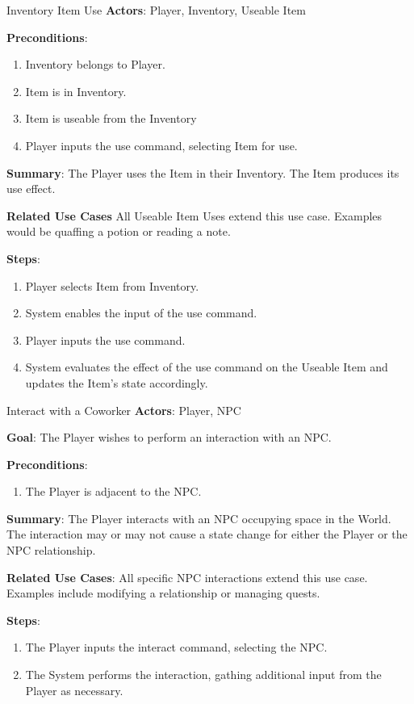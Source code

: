 \documentclass[12pt]{report}
\begin{document}
    \begin{subsection}{Inventory Item Use}
      \textbf{Actors}:
      Player, Inventory, Useable Item

      \textbf{Preconditions}:
      \begin{enumerate}
      	\item Inventory belongs to Player.
      	\item Item is in Inventory.
      	\item Item is useable from the Inventory
      	\item Player inputs the use command, selecting Item for use.
      \end{enumerate}

      \textbf{Summary}:
      The Player uses the Item in their Inventory. The Item produces its
      use effect.

      \textbf{Related Use Cases}
      All Useable Item Uses extend this use case. Examples would be quaffing
      a potion or reading a note.

      \textbf{Steps}:
      \begin{enumerate}
        \item Player selects Item from Inventory.
        \item System enables the input of the use command.
        \item Player inputs the use command.
        \item System evaluates the effect of the use command on the
        Useable Item and updates the Item's state accordingly.
      \end{enumerate}
    \end{subsection}


    \begin{subsection}{Interact with a Coworker}
      \textbf{Actors}:
      Player, NPC

      \textbf{Goal}:
      The Player wishes to perform an interaction with an NPC.

      \textbf{Preconditions}:
      \begin{enumerate}
        \item The Player is adjacent to the NPC.
      \end{enumerate}

      \textbf{Summary}:
      The Player interacts with an NPC occupying space in the World. The
      interaction may or may not cause a state change for either the Player or
      the NPC relationship.

      \textbf{Related Use Cases}:
      All specific NPC interactions extend this use case. Examples include
      modifying a relationship or managing quests.

      \textbf{Steps}:
      \begin{enumerate}
        \item The Player inputs the interact command, selecting the NPC.
        \item The System performs the interaction, gathing additional input from the
	      Player as necessary.
      \end{enumerate}
    \end{subsection}
\end{document}

